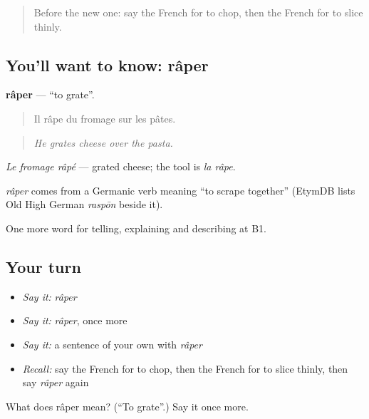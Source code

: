 \label{lesson:FR-C328-raper}



\begin{quote}
Before the new one: say the French for to chop, then the French for to slice thinly.
\end{quote}

\subsection*{You'll want to know: râper}
\textbf{râper} — \textquotedblleft{}to grate\textquotedblright{}.

\begin{quote}
Il râpe du fromage sur les pâtes.
\end{quote}

\begin{quote}
\emph{He grates cheese over the pasta.}
\end{quote}

\emph{Le fromage râpé} — grated cheese; the tool is \emph{la râpe}.

\begin{cousinweb}
\emph{râper} comes from a Germanic verb meaning \textquotedblleft{}to scrape together\textquotedblright{} (EtymDB lists Old High German \emph{raspōn} beside it).
\end{cousinweb}

\begin{grammarlens}[title={What you've built}]
One more word for telling, explaining and describing at B1.
\end{grammarlens}

\subsection*{Your turn}
\begin{itemize}
\raggedright
  \item \emph{Say it:} \emph{râper}
  \item \emph{Say it:} \emph{râper}, once more
  \item \emph{Say it:} a sentence of your own with \emph{râper}
  \item \emph{Recall:} say the French for to chop, then the French for to slice thinly, then say \emph{râper} again
\end{itemize}

\begin{tcolorbox}[breakable,colback=teal!4,colframe=teal!35!black,title={Before you move on}]
What does râper mean? (\textquotedblleft{}To grate\textquotedblright{}.) Say it once more.
\end{tcolorbox}

